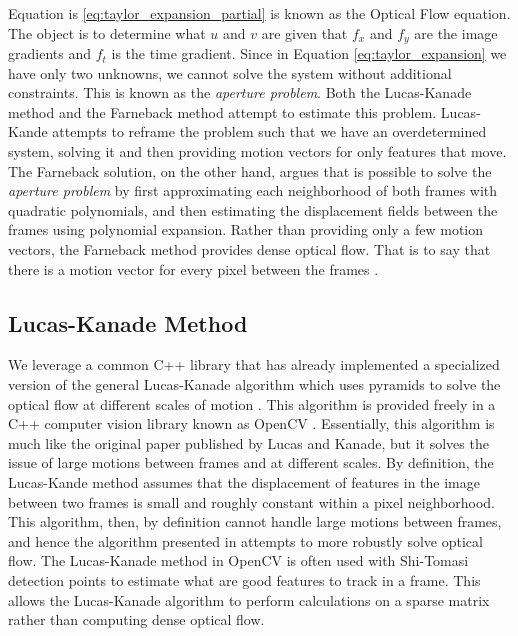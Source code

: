  Equation is \ref{eq:taylor_expansion_partial} is known as the Optical Flow
 equation. The object is to determine what $u$ and $v$ are given that $f_x$ and
 $f_y$ are the image gradients and $f_t$ is the time gradient. Since in Equation
 \ref{eq:taylor_expansion} we have only two unknowns, we cannot solve the system
 without additional constraints. This is known as the \textit{aperture problem}.
 Both the Lucas-Kanade method and the Farneback method attempt to estimate this
 problem. Lucas-Kande attempts to reframe the problem such that we have an
 overdetermined system, solving it and then providing motion vectors for only
 features that move. The Farneback solution, on the other hand, argues that is
 possible to solve the \textit{aperture problem} by first approximating each
 neighborhood of both frames with quadratic polynomials, and then estimating the
 displacement fields between the frames using polynomial expansion. Rather than
 providing only a few motion vectors, the Farneback method provides dense
 optical flow. That is to say that there is a motion vector for every pixel
 between the frames \cite{farneback2003two}.

\subsection{\label{subsection:lucas_kanade} Lucas-Kanade Method}
We leverage a common C++ library that has already implemented a specialized
version of the general Lucas-Kanade algorithm which uses pyramids to solve the
optical flow at different scales of motion \cite{bouguet2001pyramidal}. This
algorithm is provided freely in a C++ computer vision library known as OpenCV
\cite{itseez2015opencv}. Essentially, this algorithm is much like the original
paper published by Lucas and Kanade, but it solves the issue of large motions
between frames and at different scales. By definition, the Lucas-Kande method
assumes that the displacement of features in the image between two frames is
small and roughly constant within a pixel neighborhood. This algorithm, then, by
definition cannot handle large motions between frames, and hence the algorithm
presented in \cite{bouguet2001pyramidal} attempts to more robustly solve optical
flow. The Lucas-Kanade method in OpenCV is often used with Shi-Tomasi
\cite{shi1994good} detection points to estimate what are good features to track
in a frame. This allows the Lucas-Kanade algorithm to perform calculations on a
sparse matrix rather than computing dense optical flow.

